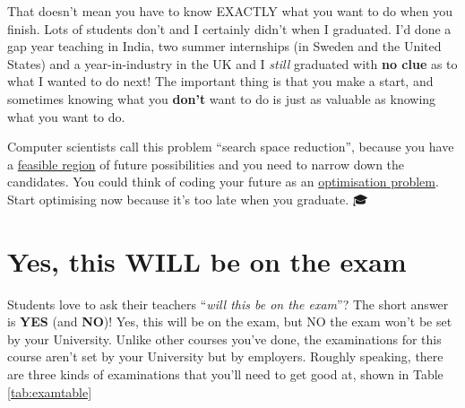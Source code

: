 \documentclass[
]{book}
\begin{document}
That doesn't mean you have to know EXACTLY what you want to do when you finish. Lots of students don't and I certainly didn't when I graduated. I'd done a gap year teaching in India, two summer internships (in Sweden and the United States) and a year-in-industry in the UK and I \emph{still} graduated with \textbf{no clue} as to what I wanted to do next! The important thing is that you make a start, and sometimes knowing what you \textbf{don't} want to do is just as valuable as knowing what you want to do.

Computer scientists call this problem ``search space reduction'', \citep{searchspace} because you have a \href{https://en.wikipedia.org/wiki/Feasible_region}{feasible region} of future possibilities and you need to narrow down the candidates. You could think of coding your future as an \href{https://en.wikipedia.org/wiki/Optimization_problem}{optimisation problem}. Start optimising now because it's too late when you graduate. 🎓

\hypertarget{exams}{%
\section{Yes, this WILL be on the exam}\label{exams}}

Students love to ask their teachers ``\emph{will this be on the exam}''? The short answer is \textbf{YES} (and \textbf{NO})! Yes, this will be on the exam, but NO the exam won't be set by your University. Unlike other courses you've done, the examinations for this course aren't set by your University but by employers. Roughly speaking, there are three kinds of examinations that you'll need to get good at, shown in Table \ref{tab:examtable}
\end{document}
